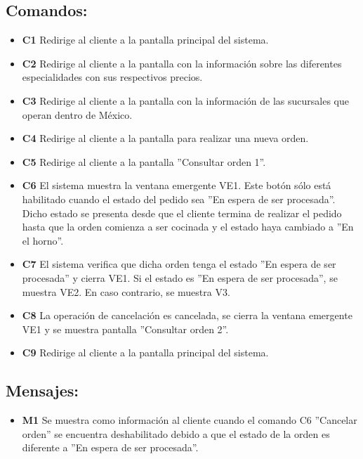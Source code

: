 \documentclass[oneside,10pt]{book}
\begin{document}
\subsection{Comandos:}
\begin{itemize}
\item \textbf{C1} Redirige al cliente a la pantalla principal del sistema.
\item \textbf{C2} Redirige al cliente a la pantalla con la información sobre las diferentes especialidades con sus respectivos precios.
\item \textbf{C3} Redirige al cliente a la pantalla con la información de las sucursales que operan dentro de México.
\item \textbf{C4} Redirige al cliente a la pantalla para realizar una nueva orden.
\item \textbf{C5} Redirige al cliente a la pantalla ''Consultar orden 1''.
\item \textbf{C6} El sistema muestra la ventana emergente VE1. Este botón sólo está habilitado cuando el estado del pedido sea ''En espera de ser procesada''. Dicho estado se presenta desde que el cliente termina de realizar el pedido hasta que la orden comienza a ser cocinada y el estado haya cambiado a ''En el horno''.
\item \textbf{C7} El sistema verifica que dicha orden tenga el estado ''En espera de ser procesada'' y cierra VE1. Si el estado es ''En espera de ser procesada'', se muestra VE2. En caso contrario, se muestra V3.
\item \textbf{C8} La operación de cancelación es cancelada, se cierra la ventana emergente VE1 y se muestra pantalla ''Consultar orden 2''.
\item \textbf{C9} Redirige al cliente a la pantalla principal del sistema.
\end{itemize}

\subsection{Mensajes:}
\begin{itemize}
\item \textbf{M1} Se muestra como información al cliente cuando el comando C6 ''Cancelar orden'' se encuentra deshabilitado debido a que el estado de la orden es diferente a ''En espera de ser procesada''.
\end{itemize}
\end{document}
